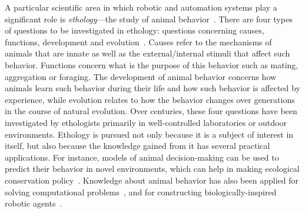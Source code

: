  
A particular scientific area in which robotic and automation systems play a significant role is \textit{ethology}---the study of animal behavior~\cite{Bolhuis_2004}. There are four types of questions to be investigated in ethology: questions concerning causes, functions, development and evolution~\cite{Bolhuis_2004}. Causes refer to the mechanisms of animals that are innate as well as the external/internal stimuli that affect such behavior. Functions concern what is the purpose of this behavior such as mating, aggregation or foraging. The development of animal behavior concerns how animals learn such behavior during their life and how such behavior is affected by experience, while evolution relates to how the behavior changes over generations in the course of natural evolution. Over centuries, these four questions have been investigated by ethologists primarily in well-controlled laboratories or outdoor environments. Ethology is pursued not only because it is a subject of interest in itself, but also because the knowledge gained from it has several practical applications. For instance, models of animal decision-making can be used to predict their behavior in novel environments, which can help in making ecological conservation policy~\cite{Sutherland1998}. Knowledge about animal behavior has also been applied for solving computational problems~\citep{Floreano2008}, and for constructing biologically-inspired robotic agents~\citep{Meyer2008}. 

